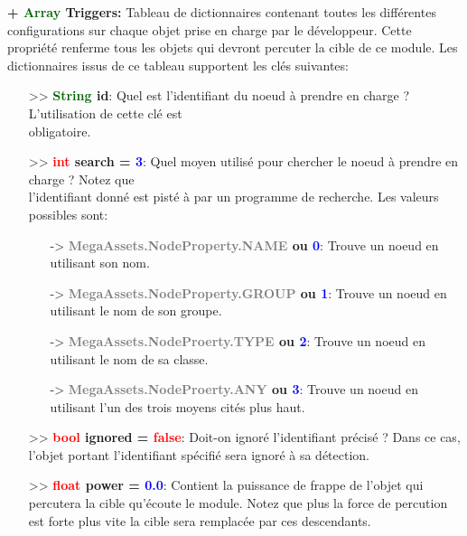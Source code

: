 \documentclass[a4paper, 11pt]{article}
\begin{document}
	\textbf{+ \textcolor{darkgreen}{Array} Triggers:} Tableau de dictionnaires contenant toutes les 
	différentes configurations sur chaque objet prise en charge par le développeur. Cette propriété renferme 
	tous les objets qui devront percuter la cible de ce module. Les dictionnaires issus de ce tableau 
	supportent les clés suivantes:\\
	\begin{itemize}
		\item[>> \textbf{\textcolor{darkgreen}{String} id}:] Quel est l'identifiant du noeud à prendre en 
		charge ? L'utilisation de cette clé est \\obligatoire.\\
		\item[>> \textbf{\textcolor{red}{int} search = \textcolor{blue}{3}}:] Quel moyen utilisé pour 
		chercher le noeud à prendre en charge ? Notez que \\l'identifiant donné est pisté à par un programme 
		de recherche. Les valeurs possibles sont:
		\begin{itemize}
			\item [-> \textbf{\textcolor{gray}{MegaAssets.NodeProperty.NAME} ou \textcolor{blue}{0}}:] 
			Trouve un noeud en utilisant son nom.
			\item [-> \textbf{\textcolor{gray}{MegaAssets.NodeProperty.GROUP} ou \textcolor{blue}{1}}:] 
			Trouve un noeud en utilisant le nom de son groupe.
			\item [-> \textbf{\textcolor{gray}{MegaAssets.NodeProerty.TYPE} ou \textcolor{blue}{2}}:] Trouve 
			un noeud en utilisant le nom de sa classe.
			\item [-> \textbf{\textcolor{gray}{MegaAssets.NodeProerty.ANY} ou \textcolor{blue}{3}}:] Trouve 
			un noeud en utilisant l'un des trois moyens cités plus haut.\\
		\end{itemize}
		\item[>> \textbf{\textcolor{red}{bool} ignored = \textcolor{red}{false}}:] Doit-on ignoré
		l'identifiant précisé ? Dans ce cas, l'objet portant l'identifiant spécifié sera ignoré à sa 
		détection.\\
		\item[>> \textbf{\textcolor{red}{float} power = \textcolor{blue}{0.0}}:] Contient la puissance de 
		frappe de l'objet qui percutera la cible qu'écoute le module. Notez que plus la force de percution
		est forte plus vite la cible sera remplacée par ces descendants.
	\end{itemize}
\end{document}
